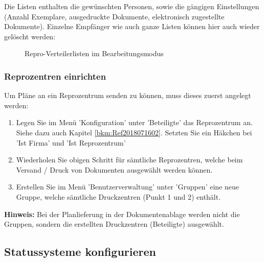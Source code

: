 Die Listen enthalten die gewünschten Personen, sowie die gängigen Einstellungen (Anzahl Exemplare, ausgedruckte Dokumente, elektronisch zugestellte Dokumente). Einzelne Empfänger wie auch ganze Listen können hier auch wieder gelöscht werden:

\begin{figure}[H]
\caption{Repro-Verteilerlisten im Bearbeitungsmodus}
\end{figure}

\subsubsection{Reprozentren einrichten}
\label{bkm:Ref2018071601}

Um Pläne an ein Reprozentrum senden zu können, muss dieses zuerst angelegt werden:

\begin{enumerate}
\item Legen Sie im Menü 'Konfiguration' unter 'Beteiligte' das Reprozentrum an. Siehe dazu auch Kapitel \ref{bkm:Ref2018071602}. Setzten Sie ein Häkchen bei 'Ist Firma' und 'Ist Reprozentrum'
\item Wiederholen Sie obigen Schritt für sämtliche Reprozentren, welche beim Versand / Druck von Dokumenten ausgewählt werden können.
\item Erstellen Sie im Menü 'Benutzerverwaltung' unter 'Gruppen' eine neue Gruppe, welche sämtliche Druckzentren (Punkt 1 und 2) enthält.
\end{enumerate}

\textbf{Hinweis:} Bei der Planlieferung in der Dokumentenablage werden nicht die Gruppen, sondern die erstellten Druckzentren (Beteiligte) ausgewählt.

\subsection{Statussysteme konfigurieren}

